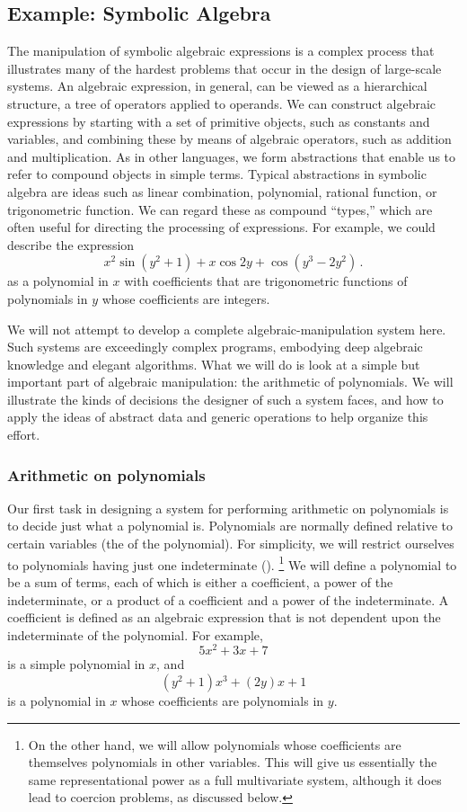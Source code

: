 \subsection{Example: Symbolic Algebra}
\label{Section 2.5.3}

The manipulation of symbolic algebraic expressions is a complex process that illustrates many of the hardest problems that occur in the design of large-scale systems.
An algebraic expression, in general, can be viewed as a hierarchical structure, a tree of operators applied to operands.
We can construct algebraic expressions by starting with a set of primitive objects, such as constants and variables, and combining these by means of algebraic operators, such as addition and multiplication.
As in other languages, we form abstractions that enable us to refer to compound objects in simple terms.
Typical abstractions in symbolic algebra are ideas such as linear combination, polynomial, rational function, or trigonometric function.
We can regard these as compound “types,” which are often useful for directing the processing of expressions.
For example, we could describe the expression
\[
	x^2 \sin (y^2 + 1) + x \cos 2y + \cos(y^3 - 2y^2) \,.
\]
as a polynomial in \( x \) with coefficients that are trigonometric functions of polynomials in \( y \) whose coefficients are integers.

We will not attempt to develop a complete algebraic-manipulation system here.
Such systems are exceedingly complex programs, embodying deep algebraic knowledge and elegant algorithms.
What we will do is look at a simple but important part of algebraic manipulation:
the arithmetic of polynomials.
We will illustrate the kinds of decisions the designer of such a system faces, and how to apply the ideas of abstract data and generic operations to help organize this effort.



\subsubsection*{Arithmetic on polynomials}

Our first task in designing a system for performing arithmetic on polynomials is to decide just what a polynomial is.
Polynomials are normally defined relative to certain variables (the  of the polynomial).
For simplicity, we will restrict ourselves to polynomials having just one indeterminate ().%
\footnote{
	On the other hand, we will allow polynomials whose coefficients are themselves polynomials in other variables.
	This will give us essentially the same representational power as a full multivariate system, although it does lead to coercion problems, as discussed below.
}
We will define a polynomial to be a sum of terms, each of which is either a coefficient, a power of the indeterminate, or a product of a coefficient and a power of the indeterminate.
A coefficient is defined as an algebraic expression that is not dependent upon the indeterminate of the polynomial.
For example,
\[
	5 x^2 + 3 x + 7
\]
is a simple polynomial in \( x \), and
\[
	(y^2 + 1) x^3 + (2y) x + 1
\]
is a polynomial in \( x \) whose coefficients are polynomials in \( y \).

